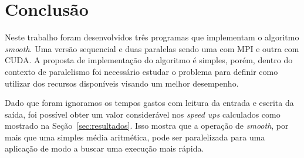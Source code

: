 \newpage
\section{Conclusão \label{sec:conclusao}}

Neste trabalho foram desenvolvidos três programas que implementam o algoritmo \textit{smooth}. Uma versão sequencial e duas paralelas sendo uma com MPI e outra com CUDA. A proposta de implementação do algoritmo é simples, porém, dentro do contexto de paralelismo foi necessário estudar o problema para definir como utilizar dos recursos disponíveis visando um melhor desempenho.

Dado que foram ignoramos os tempos gastos com leitura da entrada e escrita da saída, foi possível obter um valor considerável nos \textit{speed ups} calculados como mostrado na Seção~\ref{sec:resultados}. Isso mostra que a operação de \textit{smooth}, por mais que uma simples média aritmética, pode ser paralelizada para uma aplicação de modo a buscar uma execução mais rápida.
